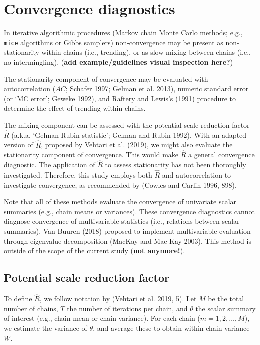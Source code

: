 \documentclass[
  Royal, times, sageapa]{sagej}
\begin{document}
\hypertarget{convergence-diagnostics}{%
\section{Convergence diagnostics}\label{convergence-diagnostics}}

In iterative algorithmic procedures (Markov chain Monte Carlo methods;
e.g., \texttt{mice} algorithms or Gibbs samplers) non-convergence may be
present as non-stationarity within chains (i.e., trending), or as slow
mixing between chains (i.e., no intermingling). (\textbf{add
example/guidelines visual inspection here?})

The stationarity component of convergence may be evaluated with
autocorrelation (\(AC\); Schafer 1997; Gelman et al. 2013), numeric
standard error (or `MC error'; Geweke 1992), and Raftery and Lewis's
(1991) procedure to determine the effect of trending within chains.

The mixing component can be assessed with the potential scale reduction
factor \(\widehat{R}\) (a.k.a. `Gelman-Rubin statistic'; Gelman and
Rubin 1992). With an adapted version of \(\widehat{R}\), proposed by
Vehtari et al. (2019), we might also evaluate the stationarity component
of convergence. This would make \(\widehat{R}\) a general convergence
diagnostic. The application of \(\widehat{R}\) to assess stationarity
has not been thoroughly investigated. Therefore, this study employs both
\(\widehat{R}\) and autocorrelation to investigate convergence, as
recommended by (Cowles and Carlin 1996, 898).

Note that all of these methods evaluate the convergence of univariate
scalar summaries (e.g., chain means or variances). These convergence
diagnostics cannot diagnose convergence of multivariable statistics
(i.e., relations between scalar summaries). Van Buuren (2018) proposed
to implement multivariable evaluation through eigenvalue decomposition
(MacKay and Mac Kay 2003). This method is outside of the scope of the
current study (\textbf{not anymore!}).

\hypertarget{potential-scale-reduction-factor}{%
\subsection{Potential scale reduction
factor}\label{potential-scale-reduction-factor}}

To define \(\widehat{R}\), we follow notation by (Vehtari et al. 2019,
5). Let \(M\) be the total number of chains, \(T\) the number of
iterations per chain, and \(\theta\) the scalar summary of interest
(e.g., chain mean or chain variance). For each chain
(\(m = 1, 2, \dots, M\)), we estimate the variance of \(\theta\), and
average these to obtain within-chain variance \(W\).
\end{document}
